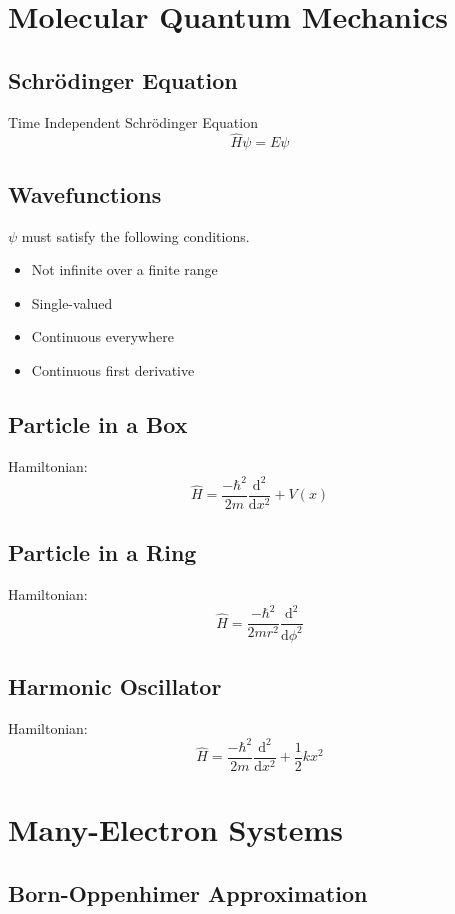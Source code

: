 
\section{Molecular Quantum Mechanics}

\subsection*{Schrödinger Equation}
Time Independent Schrödinger Equation \\
\begin{equation*}
    \hat{H}\psi = E\psi
\end{equation*}


\subsection*{Wavefunctions}
$\psi$ must satisfy the following conditions.
\begin{itemize}
    \item Not infinite over a finite range
    \item Single-valued
    \item Continuous everywhere
    \item Continuous first derivative
\end{itemize}

\subsection*{Particle in a Box}
Hamiltonian:
$$\hat{H} = \frac{-\hbar^2}{2m} \frac{\mathrm{d}^2}{\mathrm{d}x^2} + V(x)$$

\subsection*{Particle in a Ring}
Hamiltonian:
$$\hat{H} = \frac{-\hbar^2}{2mr^2} \frac{\mathrm{d}^2}{\mathrm{d}\phi^2}$$

\subsection*{Harmonic Oscillator}
Hamiltonian:
$$\hat{H} = \frac{-\hbar^2}{2m} \frac{\mathrm{d}^2}{\mathrm{d}x^2} + \frac{1}{2}kx^2$$

\section{Many-Electron Systems}
\subsection*{Born-Oppenhimer Approximation}

